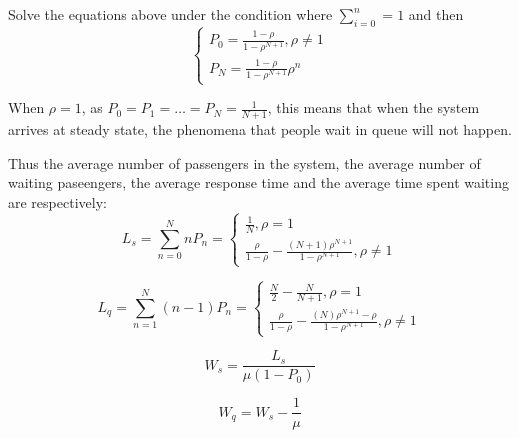 \documentclass{mcmthesis}
\begin{document}
\begin{enumerate}
	Solve the equations above under the condition where ${\sum\limits_{i=0}^{n} = 1}$ and then
	\begin{equation}    
\left  \{
       \begin{array}{lr}
            P_0 = \frac {1 - \rho}{1 - \rho ^{N+1}} , \rho \ne 1\\
            P_N = \frac{1 - \rho}{1 - \rho ^{N+1}} \rho ^{n}
        \end{array}
\right.
\end{equation}

	When ${\rho = 1}$, as ${P_0 = P_1 = \dots =P_N =\frac{1}{N+1}}$, this means that when the system arrives at steady state, the phenomena that people wait in queue will not happen.

	Thus the average number of passengers in the system, the average number of waiting paseengers, the average response time and the average time spent waiting are respectively:
\begin{equation}    
L_s = \sum\limits_{n=0}^{N} nP_n= \left  \{
       \begin{array}{lr}
          \frac {1}{N}, \rho = 1\\
          \frac{\rho}{1-\rho} - \frac{(N+1) \rho^{N+1}}{1 - \rho^{N+1}} , \rho \ne 1
        \end{array}
\right.
\end{equation}
 
 \begin{equation}    
L_q = \sum\limits_{n=1}^{N} (n-1)P_n= \left  \{
       \begin{array}{lr}
          \frac {N}{2} - \frac{N}{N+1}, \rho = 1\\
          \frac{\rho}{1-\rho} - \frac{(N) \rho^{N+1} - \rho}{1 - \rho^{N+1}} , \rho \ne 1
        \end{array}
\right.
\end{equation}

\begin{equation}    
W_s = \frac{L_s}{\mu (1 - P_0)}
\end{equation}

\begin{equation}    
W_q = W_s - \frac{1}{\mu}
\end{equation}

	\end{enumerate}
	
\end{document}
